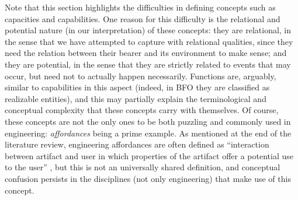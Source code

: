 \documentclass[sw]{iosart2x}
\newcommand{\BFO}{\textsc{BFO}\xspace}
\newcommand{\quotes}[1]{`#1'}
\newcommand{\qquotes}[1]{``#1''}
\newcommand{\myComment}[1]{{\unskip \ignorespaces}}
\begin{document}
Note that this section highlights the difficulties in defining concepts such as capacities and capabilities. 
One reason for this difficulty is the relational and potential nature (in our interpretation) of these concepts: they are relational, in the sense that we have attempted to capture with relational qualities, since they need the relation between their bearer and its environment to make sense; and they are potential, in the sense that they are strictly related to events that may occur, but need not to actually happen necessarily.
Functions are, arguably, similar to capabilities in this aspect (indeed, in \BFO they are classified as realizable entities), and this may partially explain the terminological and conceptual complexity that these concepts carry with themselves. 
Of course, these concepts are not the only ones to be both puzzling and commonly used in engineering: \textit{affordances} being a prime example. 
As mentioned at the end of the literature review, engineering affordances are often defined as \qquotes{interaction between artifact and user in which properties of the artifact offer a potential use to the user} \cite{maierAffordanceBasedDesign2009}, but this is not an universally shared definition, and conceptual confusion persists in the disciplines (not only engineering) that make use of this concept.
\end{document}
